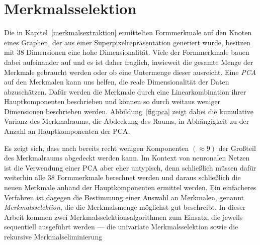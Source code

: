 \section{Merkmalsselektion}
\label{merkmalsselektion}

Die in Kapitel~\ref{merkmalsextraktion} ermittelten Formmerkmale auf den Knoten eines Graphen, der aus einer Superpixelrepräsentation generiert wurde, besitzen mit $38$ Dimensionen eine hohe Dimensionalität.
Viele der Formmerkmale bauen dabei aufeinander auf und es ist daher fraglich, inwieweit die gesamte Menge der Merkmale gebraucht werden oder ob eine Untermenge dieser ausreicht.
Eine \emph{\gls{PCA}} auf den Merkmalen kann uns helfen, die reale Dimensionalität der Daten abzuschätzen.
Dafür werden die Merkmale durch eine Linearkombination ihrer Hauptkomponenten beschrieben und können so durch weitaus weniger Dimensionen beschrieben werden.
Abbildung~\ref{fig:pca} zeigt dabei die kumulative Varianz des Merkmalraums, \dhe{} die Abdeckung des Raums, in Abhängigkeit zu der Anzahl an Hauptkomponenten der \gls{PCA}.

Es zeigt sich, dass nach bereits recht wenigen Komponenten $\left(\approx 9\right)$ der Großteil des Merkmalraums abgedeckt werden kann.
Im Kontext von neuronalen Netzen ist die Verwendung einer \gls{PCA} aber eher untypisch, denn schließlich müssen dafür weiterhin alle $38$ Formmerkmale berechnet werden und daraus schließlich die neuen Merkmale anhand der Hauptkomponenten ermittel werden.
Ein einfacheres Verfahren ist dagegen die Bestimmung einer Auswahl an Merkmalen, genannt \emph{Merkmalsselektion}, die die Merkmalsmenge möglichst gut beschreibt.
In dieser Arbeit kommen zwei Merkmalsselektionsalgorithmen zum Einsatz, die jeweils sequentiell ausgeführt werden — die univariate Merkmalsselektion sowie die rekursive Merkmalseliminierung
